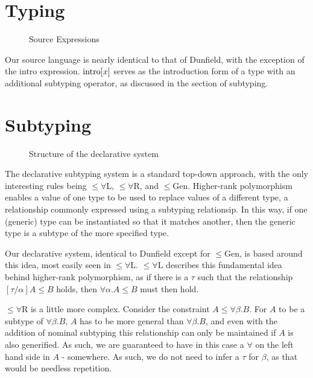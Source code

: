 \documentclass{llncs}
\begin{document}
\section{Typing}
\begin{figure}

\label{fig:terms}
\caption{Source Expressions}
\end{figure}
\begin{figure}

\end{figure}

Our source language is nearly identical to that of Dunfield, with the exception of the intro expression. $\text{intro}[x]$ serves as the introduction form of a type with an additional subtyping operator, as discussed in the section of subtyping. 

\section{Subtyping}
\begin{figure}

\label{fig:declCons}
\caption{Structure of the declarative system}
\end{figure}
\begin{figure}

\end{figure}

The declarative subtyping system is a standard top-down approach, with the only interesting rules being $\leq\forall$L, $\leq\forall$R, and $\leq$Gen. Higher-rank polymorphism enables a value of one type to be used to replace values of a different type, a relationship commonly expressed using a subtyping relationsip. In this way, if one (generic) type can be instantiated so that it matches another, then the generic type is a subtype of the more specified type.

Our declarative system, identical to Dunfield except for $\leq$Gen, is based around this idea, most easily seen in $\leq\forall$L. $\leq\forall$L describes this fundamental idea behind higher-rank polymorphism, as if there is a $\tau$ such that the relationship $[\tau/\alpha]A \leq B$ holds, then $\forall \alpha.A \leq B$ must then hold.

$\leq\forall$R is a little more complex. Consider the constraint $A \leq \forall \beta.B$. For $A$ to be a subtype of $\forall\beta.B$, $A$ has to be more general than $\forall \beta.B$, and even with the addition of nominal subtyping this relationship can only be maintained if $A$ is also generified. As such, we are guaranteed to have in this case a $\forall$ on the left hand side in $A$ - somewhere. As such, we do not need to infer a $\tau$ for $\beta$, as that would be needless repetition.
\end{document}
